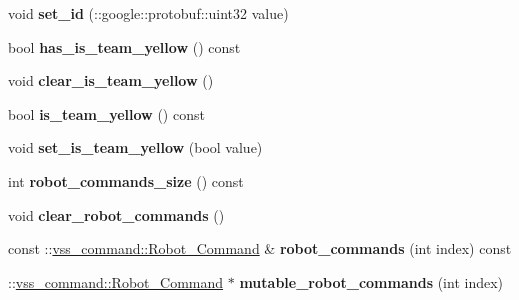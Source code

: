 \begin{DoxyCompactItemize}
\item 
void {\bfseries set\+\_\+id} (\+::google\+::protobuf\+::uint32 value)\hypertarget{classvss__command_1_1Global__Commands_aba49ba26507d3a54403584352f3dde90}{}\label{classvss__command_1_1Global__Commands_aba49ba26507d3a54403584352f3dde90}

\item 
bool {\bfseries has\+\_\+is\+\_\+team\+\_\+yellow} () const \hypertarget{classvss__command_1_1Global__Commands_a01e1a3bf6986a61900153eec4e51ac9b}{}\label{classvss__command_1_1Global__Commands_a01e1a3bf6986a61900153eec4e51ac9b}

\item 
void {\bfseries clear\+\_\+is\+\_\+team\+\_\+yellow} ()\hypertarget{classvss__command_1_1Global__Commands_ad626702bff23b842c6c342fb94ed9097}{}\label{classvss__command_1_1Global__Commands_ad626702bff23b842c6c342fb94ed9097}

\item 
bool {\bfseries is\+\_\+team\+\_\+yellow} () const \hypertarget{classvss__command_1_1Global__Commands_a82e8f2fd24d0bcbf30e924d18dd8bba8}{}\label{classvss__command_1_1Global__Commands_a82e8f2fd24d0bcbf30e924d18dd8bba8}

\item 
void {\bfseries set\+\_\+is\+\_\+team\+\_\+yellow} (bool value)\hypertarget{classvss__command_1_1Global__Commands_ac7855fe013be0c1be3f573a1b6eb47dc}{}\label{classvss__command_1_1Global__Commands_ac7855fe013be0c1be3f573a1b6eb47dc}

\item 
int {\bfseries robot\+\_\+commands\+\_\+size} () const \hypertarget{classvss__command_1_1Global__Commands_a09f12589e89e8d27a0e0d6fb7ecbcee3}{}\label{classvss__command_1_1Global__Commands_a09f12589e89e8d27a0e0d6fb7ecbcee3}

\item 
void {\bfseries clear\+\_\+robot\+\_\+commands} ()\hypertarget{classvss__command_1_1Global__Commands_a2624ae56ed92fe0cf6617f8c740ad2d2}{}\label{classvss__command_1_1Global__Commands_a2624ae56ed92fe0cf6617f8c740ad2d2}

\item 
const \+::\hyperlink{classvss__command_1_1Robot__Command}{vss\+\_\+command\+::\+Robot\+\_\+\+Command} \& {\bfseries robot\+\_\+commands} (int index) const \hypertarget{classvss__command_1_1Global__Commands_aa6bd99500ef874f4a68cbf1adecf0fd1}{}\label{classvss__command_1_1Global__Commands_aa6bd99500ef874f4a68cbf1adecf0fd1}

\item 
\+::\hyperlink{classvss__command_1_1Robot__Command}{vss\+\_\+command\+::\+Robot\+\_\+\+Command} $\ast$ {\bfseries mutable\+\_\+robot\+\_\+commands} (int index)\hypertarget{classvss__command_1_1Global__Commands_a08dc88b20105318b2cc8bbbbf2300581}{}\label{classvss__command_1_1Global__Commands_a08dc88b20105318b2cc8bbbbf2300581}


\end{DoxyCompactItemize}
